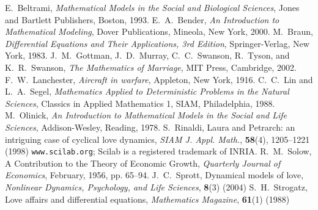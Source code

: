 \documentclass[reqno]{immbook}
\numberwithin{equation}{chapter}
\numberwithin{question}{section}
\numberwithin{theorem}{chapter}
\numberwithin{figure}{chapter}
\theoremstyle{definition}
\begin{document}
\endappendix
\backmatter

\begin{thebibliography}{99}
E.~Beltrami,
\emph{Mathematical Models in the Social and Biological Sciences},
Jones and Bartlett Publishers, Boston, 1993.
%
E.~A.~Bender,
\emph{An Introduction to Mathematical Modeling},
Dover Publications, Mineola, New York, 2000.
%
M.~Braun, \emph{Differential Equations and Their Applications,
3rd Edition},
Springer-Verlag, New York, 1983.
%
J.~M.~Gottman, J.~D.~Murray, C.~C.~Swanson,
R.~Tyson, and K.~R.~Swanson,
\emph{The Mathematics of Marriage},
MIT Press, Cambridge, 2002.
%
F.~W.~Lanchester,
\emph{Aircraft in warfare}, Appleton, New York, 1916.
C.~C.~Lin and L.~A.~Segel,
\emph{Mathematics Applied to Deterministic
Problems in the Natural Sciences},
Classics in Applied Mathematics 1,
SIAM, Philadelphia, 1988.
%
M.~Olinick,
\emph{An Introduction to Mathematical Models
in the Social and Life Sciences},
Addison-Wesley, Reading, 1978.
%
S.~Rinaldi, Laura and Petrarch: an intriguing case of
cyclical love dynamics,
\emph{SIAM J. Appl. Math.}, \textbf{58}(4), 1205--1221 (1998)
%
\texttt{www.scilab.org}; Scilab is a registered trademark
of INRIA.
%
R.~M.~Solow, A Contribution to the Theory of Economic Growth,
\emph{Quarterly Journal of Economics}, February, 1956, pp. 65--94.
J.~C.~Sprott,
Dynamical models of love,
\emph{Nonlinear Dynamics, Psychology, and Life Sciences},
\textbf{8}(3) (2004)
%
S.~H.~Strogatz, Love affairs and differential equations,
\emph{Mathematics Magazine}, \textbf{61}(1) (1988)
\end{thebibliography}
\printindex
\end{document}
